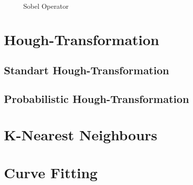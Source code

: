 \begin{figure}[!tbp]
  \centering
  \hfill
  \caption{Sobel Operator}
\end{figure}




%
\section{Hough-Transformation}\label{sec:Hough-Transformation}
%

%
\subsection{Standart Hough-Transformation}\label{sec:Standart Hough - Transformation}
%


%
\subsection{Probabilistic Hough-Transformation}\label{sec:Probabilistic Hough-Transformation}
%




%
\section{K-Nearest Neighbours}\label{sec:K-Nearest Neighbors}
%



%
\section{Curve Fitting}\label{sec:Curve Fitting}
%

%




